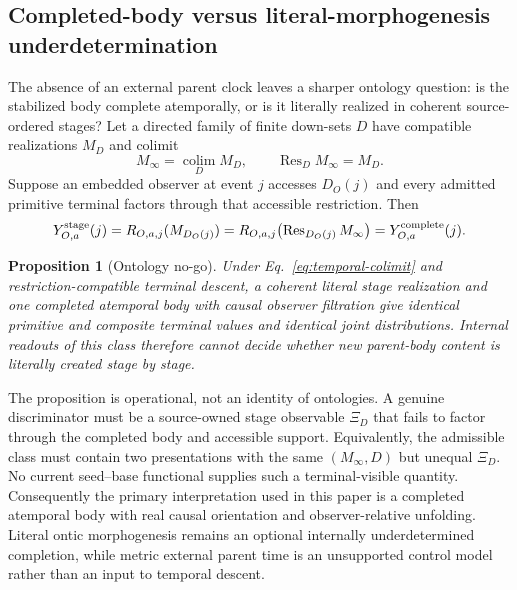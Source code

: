 \documentclass[11pt]{article}
\newtheorem{proposition}{Proposition}
\begin{document}
\subsection{Completed-body versus literal-morphogenesis underdetermination}

The absence of an external parent clock leaves a sharper ontology question:
is the stabilized body complete atemporally, or is it literally realized in
coherent source-ordered stages?  Let a directed family of finite down-sets
$D$ have compatible realizations $M_D$ and colimit
\begin{equation}
 M_\infty=\operatorname*{colim}_D M_D,
 \qquad
 \operatorname{Res}_D M_\infty=M_D.
 \label{eq:temporal-colimit}
\end{equation}
Suppose an embedded observer at event $j$ accesses $D_O(j)$ and every admitted
primitive terminal factors through that accessible restriction.  Then
\begin{equation}
 Y_{O,a}^{\rm stage}(j)
 =R_{O,a,j}(M_{D_O(j)})
 =R_{O,a,j}\!\left(\operatorname{Res}_{D_O(j)}M_\infty\right)
 =Y_{O,a}^{\rm complete}(j).
 \label{eq:temporal-ontology-equivalence}
\end{equation}

\begin{proposition}[Ontology no-go]
Under Eq.~\eqref{eq:temporal-colimit} and restriction-compatible terminal
descent, a coherent literal stage realization and one completed atemporal body
with causal observer filtration give identical primitive and composite
terminal values and identical joint distributions.  Internal readouts of this
class therefore cannot decide whether new parent-body content is literally
created stage by stage.
\end{proposition}

The proposition is operational, not an identity of ontologies.  A genuine
discriminator must be a source-owned stage observable $\Xi_D$ that fails to
factor through the completed body and accessible support.  Equivalently, the
admissible class must contain two presentations with the same
$(M_\infty,D)$ but unequal $\Xi_D$.  No current seed--base functional supplies
such a terminal-visible quantity.  Consequently the primary interpretation
used in this paper is a completed atemporal body with real causal orientation
and observer-relative unfolding.  Literal ontic morphogenesis remains an
optional internally underdetermined completion, while metric external parent
time is an unsupported control model rather than an input to temporal descent.
\end{document}
